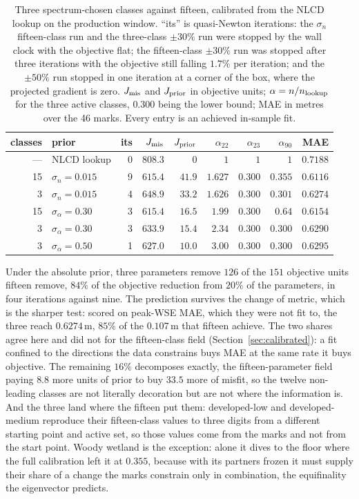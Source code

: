 \documentclass[11pt]{article}
\begin{document}
\begin{table}
\centering\small
\begin{tabular}{@{}rlrrrrrrr@{}}
\toprule
classes & prior & its & $J_{\rm mis}$ & $J_{\rm prior}$ & $\alpha_{22}$ & $\alpha_{23}$ & $\alpha_{90}$ & MAE \\
\midrule
--- & NLCD lookup & 0 & $808.3$ & $0$ & $1$ & $1$ & $1$ & $0.7188$ \\
15 & $\sigma_n = 0.015$ & 9 & $615.4$ & $41.9$ & $1.627$ & $0.300$ & $0.355$ & $0.6116$ \\
3 & $\sigma_n = 0.015$ & 4 & $648.9$ & $33.2$ & $1.626$ & $0.300$ & $0.301$ & $0.6274$ \\
15 & $\sigma_\alpha = 0.30$ & 3 & $615.4$ & $16.5$ & $1.99$ & $0.300$ & $0.64$ & $0.6154$ \\
3 & $\sigma_\alpha = 0.30$ & 3 & $633.9$ & $15.4$ & $2.34$ & $0.300$ & $0.300$ & $0.6290$ \\
3 & $\sigma_\alpha = 0.50$ & 1 & $627.0$ & $10.0$ & $3.00$ & $0.300$ & $0.300$ & $0.6295$ \\
\bottomrule
\end{tabular}
\caption{Three spectrum-chosen classes against fifteen, calibrated
from the NLCD lookup on the production window. ``its'' is
quasi-Newton iterations: the $\sigma_n$ fifteen-class run and the
three-class $\pm 30\%$ run were stopped by the wall clock with the
objective flat; the fifteen-class $\pm 30\%$ run was stopped after
three iterations with the objective still falling $1.7\%$ per
iteration; and the $\pm 50\%$ run stopped in one iteration at a corner
of the box, where the projected gradient is zero. $J_{\rm mis}$ and
$J_{\rm prior}$ in objective units; $\alpha = n / n_{\rm lookup}$
for the three active classes, $0.300$ being the lower bound; MAE in
metres over the 46 marks. Every entry is an achieved in-sample fit.}
\label{tab:threefifteen}
\end{table}

Under the absolute prior, three parameters remove $126$ of the $151$
objective units fifteen remove, $84\%$ of the objective reduction
from $20\%$ of the parameters, in four iterations against nine. The
prediction survives the change of metric, which is the sharper test:
scored on peak-WSE MAE, which they were not fit to, the three reach
$0.6274$\,m, $85\%$ of the $0.107$\,m that fifteen achieve. The two
shares agree here and did not for the fifteen-class field
(Section~\ref{sec:calibrated}): a fit confined to the directions the
data constrains buys MAE at the same rate it buys objective. The
remaining $16\%$ decomposes exactly, the fifteen-parameter field
paying $8.8$ more units of prior to buy $33.5$ more of misfit, so the
twelve non-leading classes are not literally decoration but are not
where the information is. And the three land where the fifteen put
them: developed-low and developed-medium reproduce their
fifteen-class values to three digits from a different starting point
and active set, so those values come from the marks and not from the
start point. Woody wetland is the exception: alone it dives to the
floor where the full calibration left it at $0.355$, because with its
partners frozen it must supply their share of a change the marks
constrain only in combination, the equifinality the eigenvector
predicts.
\end{document}
